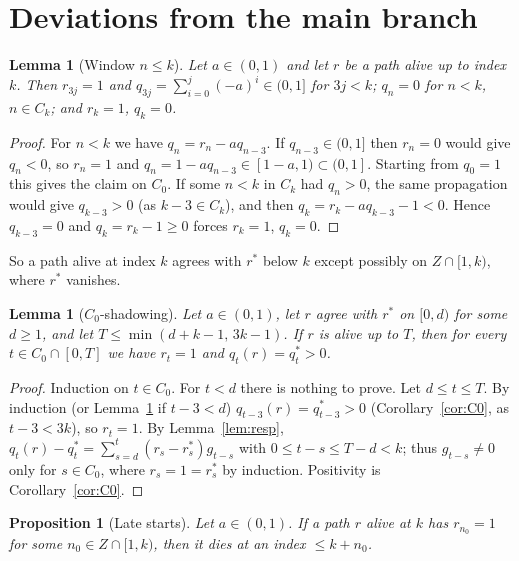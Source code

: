 \documentclass[11pt]{amsart}
\newtheorem{proposition}[theorem]{Proposition}
\newtheorem{lemma}[theorem]{Lemma}
\theoremstyle{definition}
\theoremstyle{remark}
\newcommand{\Cz}{C_0}
\newcommand{\Ck}{C_k}
\begin{document}
\section{Deviations from the main branch}\label{sec:dev}

\begin{lemma}[Window $n\le k$]\label{lem:window}
Let $a\in(0,1)$ and let $r$ be a path alive up to index $k$. Then
$r_{3j}=1$ and $q_{3j}=\sum_{i=0}^{j}(-a)^i\in(0,1]$ for $3j<k$;
$q_n=0$ for $n<k$, $n\in\Ck$; and $r_k=1$, $q_k=0$.
\end{lemma}

\begin{proof}
For $n<k$ we have $q_n=r_n-aq_{n-3}$. If $q_{n-3}\in(0,1]$ then $r_n=0$ would give
$q_n<0$, so $r_n=1$ and $q_n=1-aq_{n-3}\in[1-a,1)\subset(0,1]$. Starting from
$q_0=1$ this gives the claim on $\Cz$. If some $n<k$ in $\Ck$ had $q_n>0$, the same
propagation would give $q_{k-3}>0$ (as $k-3\in\Ck$), and then
$q_k=r_k-aq_{k-3}-1<0$. Hence $q_{k-3}=0$ and $q_k=r_k-1\ge 0$ forces $r_k=1$, $q_k=0$.
\end{proof}

So a path alive at index $k$ agrees with $r^*$ below $k$ except possibly on
$Z\cap[1,k)$, where $r^*$ vanishes.

\begin{lemma}[$\Cz$-shadowing]\label{lem:shadow}
Let $a\in(0,1)$, let $r$ agree with $r^*$ on $[0,d)$ for some $d\ge 1$, and let
$T\le\min(d+k-1,\,3k-1)$. If $r$ is alive up to $T$, then for every $t\in\Cz\cap[0,T]$
we have $r_t=1$ and $q_t(r)=q^*_t>0$.
\end{lemma}

\begin{proof}
Induction on $t\in\Cz$. For $t<d$ there is nothing to prove. Let $d\le t\le T$.
By induction (or Lemma~\ref{lem:window} if $t-3<d$) $q_{t-3}(r)=q^*_{t-3}>0$
(Corollary~\ref{cor:C0}, as $t-3<3k$), so $r_t=1$. By Lemma~\ref{lem:resp},
$q_t(r)-q^*_t=\sum_{s=d}^{t}(r_s-r^*_s)g_{t-s}$ with $0\le t-s\le T-d<k$; thus
$g_{t-s}\ne 0$ only for $s\in\Cz$, where $r_s=1=r^*_s$ by induction.
Positivity is Corollary~\ref{cor:C0}.
\end{proof}

\begin{proposition}[Late starts]\label{prop:late}
Let $a\in(0,1)$. If a path $r$ alive at $k$ has $r_{n_0}=1$ for some
$n_0\in Z\cap[1,k)$, then it dies at an index $\le k+n_0$.
\end{proposition}
\end{document}
